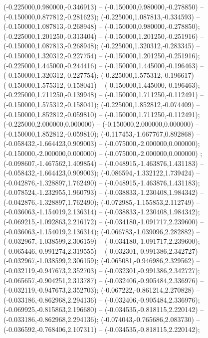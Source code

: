  (-0.225000,0.980000,-0.346913) -- (-0.150000,0.980000,-0.278850) -- (-0.150000,0.877812,-0.281623);
 (-0.225000,1.087813,-0.334593) -- (-0.150000,1.087813,-0.268948) -- (-0.150000,0.980000,-0.278850);
 (-0.225000,1.201250,-0.313404) -- (-0.150000,1.201250,-0.251916) -- (-0.150000,1.087813,-0.268948);
 (-0.225000,1.320312,-0.283345) -- (-0.150000,1.320312,-0.227754) -- (-0.150000,1.201250,-0.251916);
 (-0.225000,1.445000,-0.244416) -- (-0.150000,1.445000,-0.196463) -- (-0.150000,1.320312,-0.227754);
 (-0.225000,1.575312,-0.196617) -- (-0.150000,1.575312,-0.158041) -- (-0.150000,1.445000,-0.196463);
 (-0.225000,1.711250,-0.139948) -- (-0.150000,1.711250,-0.112491) -- (-0.150000,1.575312,-0.158041);
 (-0.225000,1.852812,-0.074409) -- (-0.150000,1.852812,-0.059810) -- (-0.150000,1.711250,-0.112491);
 (-0.225000,2.000000,0.000000) -- (-0.150000,2.000000,0.000000) -- (-0.150000,1.852812,-0.059810);
 (-0.117453,-1.667767,0.892868) -- (-0.058432,-1.664423,0.909003) -- (-0.075000,-2.000000,0.000000);
 (-0.150000,-2.000000,0.000000) -- (-0.075000,-2.000000,0.000000) ;
 (-0.098607,-1.467562,1.409854) -- (-0.048915,-1.463876,1.431183) -- (-0.058432,-1.664423,0.909003);
 (-0.086594,-1.332122,1.739424) -- (-0.042876,-1.328897,1.762490) -- (-0.048915,-1.463876,1.431183);
 (-0.078524,-1.232955,1.960793) -- (-0.038833,-1.230408,1.984342) -- (-0.042876,-1.328897,1.762490);
 (-0.072985,-1.155853,2.112749) -- (-0.036063,-1.154019,2.136314) -- (-0.038833,-1.230408,1.984342);
 (-0.069215,-1.092863,2.216172) -- (-0.034180,-1.091717,2.239600) -- (-0.036063,-1.154019,2.136314);
 (-0.066783,-1.039096,2.282882) -- (-0.032967,-1.038599,2.306159) -- (-0.034180,-1.091717,2.239600);
 (-0.065446,-0.991274,2.319555) -- (-0.032301,-0.991386,2.342727) -- (-0.032967,-1.038599,2.306159);
 (-0.065081,-0.946986,2.329562) -- (-0.032119,-0.947673,2.352703) -- (-0.032301,-0.991386,2.342727);
 (-0.065657,-0.904251,2.313787) -- (-0.032406,-0.905484,2.336976) -- (-0.032119,-0.947673,2.352703);
 (-0.067222,-0.861214,2.270828) -- (-0.033186,-0.862968,2.294136) -- (-0.032406,-0.905484,2.336976);
 (-0.069925,-0.815863,2.196680) -- (-0.034535,-0.818115,2.220142) -- (-0.033186,-0.862968,2.294136);
 (-0.074043,-0.765686,2.083730) -- (-0.036592,-0.768406,2.107311) -- (-0.034535,-0.818115,2.220142);
